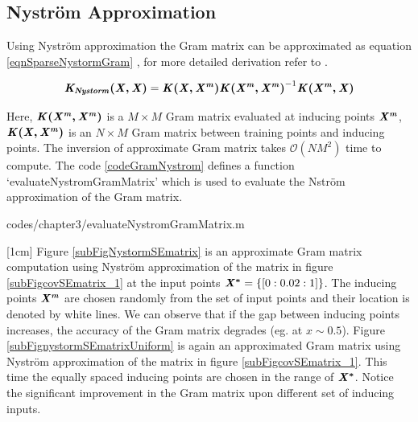 \subsection{Nystr\"{o}m Approximation}\label{subSecNystrom} 

Using Nystr\"{o}m approximation the Gram matrix can be approximated as equation \ref{eqnSparseNystormGram} \cite{quinonero2005unifying, seeger2003fast}, for more detailed derivation refer to \cite{williams2001using}. 

\begin{equation}\label{eqnSparseNystormGram}
\bm{\mathit{K_{Nystorm}(X, X)}} = \bm{\mathit{K(X, X^{m})}} \bm{\mathit{K(X^{m}, X^{m})}}^{-1} \bm{\mathit{K(X^{m}, X)}}
\end{equation}

Here, $\bm{\mathit{K(X^{m}, X^{m})}}$ is a $M \times M$ Gram matrix evaluated at inducing points $\bm{\mathit{X^{m}}}$, $\bm{\mathit{K(X, X^{m})}}$ is an $N \times M$ Gram matrix between training points and inducing points. The inversion of approximate Gram matrix takes $\mathcal{O}\left ( NM^{2} \right )$ time to compute. The code \ref{codeGramNystrom} defines a function `evaluateNystromGramMatrix' which is used to evaluate the Nstr\"{o}m approximation of the Gram matrix. 

\begin{mdframed}[hidealllines=true,backgroundcolor=lightgray!20]

                    {codes/chapter3/evaluateNystromGramMatrix.m}
\end{mdframed}

[1cm]
Figure \ref{subFigNystormSEmatrix} is an approximate Gram matrix computation using Nystr\"{o}m approximation of the matrix in figure \ref{subFigcovSEmatrix_1} at the input points $\bm{\mathit{X^{*}}} = \{[0:0.02:1]\}$. The inducing points $\bm{\mathit{X^{m}}}$ are chosen randomly from the set of input points and their location is denoted by white lines. We can observe that if the gap between inducing points increases, the accuracy of the Gram matrix degrades (eg. at $x \sim 0.5$). Figure \ref{subFignystormSEmatrixUniform} is again an approximated Gram matrix using Nystr\"{o}m approximation of the matrix in figure \ref{subFigcovSEmatrix_1}. This time the equally spaced inducing points are chosen in the range of $\bm{\mathit{X^{*}}}$. Notice the significant improvement in the Gram matrix upon different set of inducing inputs.

